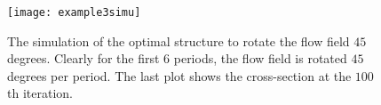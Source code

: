  \begin{figure}
    \centerline{
   \texttt{[image: example3simu]}}
    \caption{\label{example3figure2} The simulation of the optimal structure to rotate the flow field $45$ degrees. Clearly for the first $6$ periods, the flow field is rotated $45$ degrees per period. The last plot shows the cross-section at the $100$th iteration.}
  \end{figure}

